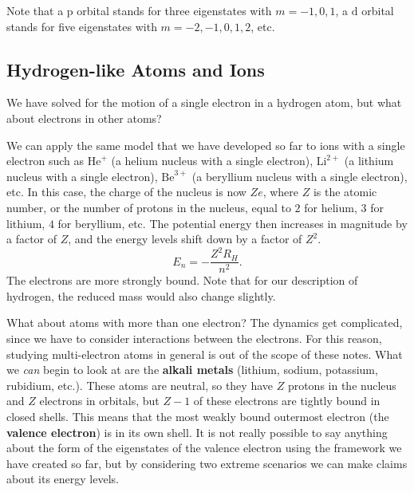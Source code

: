 \documentclass[../quantum_mechanics.tex]{subfiles}
\begin{document}
            Note that a $\text{p}$ orbital stands for three eigenstates with $m=-1,0,1$, a $\text{d}$ orbital stands for five eigenstates with $m=-2,-1,0,1,2$, etc.

        \subsection{Hydrogen-like Atoms and Ions}\label{sec:energy-eigenstates:subsec:hydrogen-like-atoms}
            We have solved for the motion of a single electron in a hydrogen atom, but what about electrons in other atoms?

            We can apply the same model that we have developed so far to ions with a single electron such as $\text{He}^+$ (a helium nucleus with a single electron), $\text{Li}^{2+}$ (a lithium nucleus with a single electron), $\text{Be}^{3+}$ (a beryllium nucleus with a single electron), etc.
            In this case, the charge of the nucleus is now $Ze$, where $Z$ is the atomic number, or the number of protons in the nucleus, equal to $2$ for helium, $3$ for lithium, $4$ for beryllium, etc.
            The potential energy then increases in magnitude by a factor of $Z$, and the energy levels shift down by a factor of $Z^2$.
            \begin{equation}
                E_n=-\frac{Z^2R_H}{n^2}.
            \end{equation}
            The electrons are more strongly bound.
            Note that for our description of hydrogen, the reduced mass would also change slightly.

            What about atoms with more than one electron?
            The dynamics get complicated, since we have to consider interactions between the electrons.
            For this reason, studying multi-electron atoms in general is out of the scope of these notes.
            What we \textit{can} begin to look at are the \textbf{alkali metals} (lithium, sodium, potassium, rubidium, etc.).
            These atoms are neutral, so they have $Z$ protons in the nucleus and $Z$ electrons in orbitals, but $Z-1$ of these electrons are tightly bound in closed shells.
            This means that the most weakly bound outermost electron (the \textbf{valence electron}) is in its own shell.
            It is not really possible to say anything about the form of the eigenstates of the valence electron using the framework we have created so far, but by considering two extreme scenarios we can make claims about its energy levels.
\end{document}
